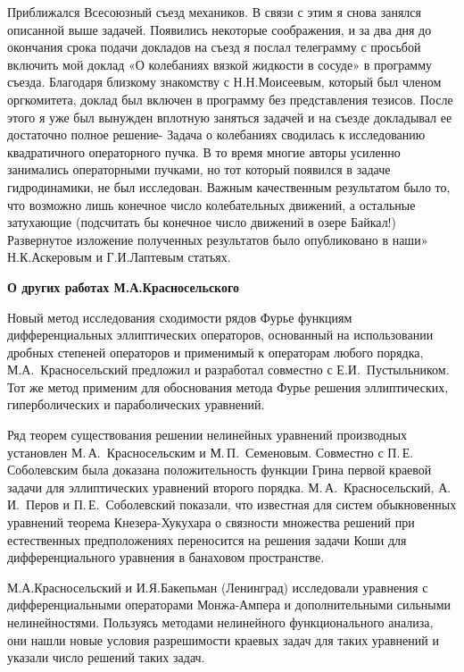 Приближался Всесоюзный съезд механиков. В связи с этим я снова занялся описанной выше задачей. Появились некоторые соображения, и за два дня до окончания срока подачи докладов на съезд я послал телеграмму с просьбой включить мой доклад «О колебаниях вязкой жидкости в сосуде» в программу съезда. Благодаря близкому знакомству с Н.Н.Моисеевым, который был членом оргкомитета, доклад был включен в программу без представления тезисов. После этого я уже был вынужден вплотную заняться задачей и на съезде докладывал ее достаточно полное решение- Задача о колебаниях сводилась к исследованию квадратичного операторного пучка. В то время многие авторы усиленно занимались операторными пучками, но тот который появился в задаче гидродинамики, не был исследован. Важным качественным результатом было то, что возможно лишь конечное число колебательных движений, а остальные затухающие (подсчитать бы конечное число движений в озере Байкал!) Развернутое изложение полученных результатов было опубликовано в наши» Н.К.Аскеровым и Г.И.Лаптевым статьях.

{\bf О других работах М.А.Красносельского}

Новый метод исследования сходимости рядов Фурье фу\-н\-к\-ци\-ям дифференциальных эллиптических операторов,
основанный на  использовании дробных степеней операторов и применимый к операторам любого порядка,
М.А.~Красносельский предложил и разработал совместно с Е.И.~Пустыльником.  Тот же метод применим для обоснования метода Фурье
решения эллиптических, гиперболических и параболических уравнений.

Ряд теорем существования решении нелинейных уравнений производных установлен М.\,А.~Красносельским и
\linebreak
М.\,П.~Семеновым.
Совместно с П.\,Е. Соболевским  была доказана
положительность функции Грина первой краевой задачи для эллиптических уравнений второго порядка.
\linebreak
М.\,А.~Красносельский, А.\,И.~Перов и П.\,Е.~Соболевский показали,
что известная для систем обыкновенных уравнений теорема Кне\-зе\-ра-Ху\-ку\-ха\-ра о связности множества решений при естественных предположениях переносится на решения задачи Коши для дифференциального уравнения в банаховом пространстве.

М.А.Красносельский и И.Я.Бакепьман (Ленинград) исследовали уравнения с дифференциальными операторами Монжа-Ампера и дополнительными сильными нелинейностями. Пользуясь методами нелинейного функционального анализа, они нашли новые условия разрешимости краевых задач для таких уравнений и указали число решений таких задач.

